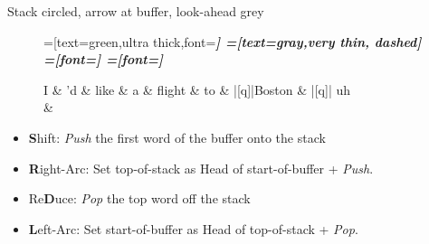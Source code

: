 \documentclass{lecture}
\begin{document}
\begin{plain}{Stack circled, arrow at buffer, look-ahead grey}
\begin{figure}
    \centering
    \begin{dependency}[theme=simple]
    =[text=green,ultra thick,font=\bfseries\itshape]
    =[text=gray,very thin, dashed]
    =[font=\bfseries\itshape]
    =[font=\itshape]
    \begin{deptext}[column sep=.075cm, row sep=.1ex]
        I \& 'd \& like \& a \& flight \& to \& |[q]|Boston \& |[q]| uh \\
         \& \\
    \end{deptext}
\end{dependency}
\end{figure}
    \begin{itemize}
        \item \textbf{S}hift: \emph{Push} the first word of the buffer onto the stack
    \item \textbf{R}ight-Arc: Set top-of-stack as Head of start-of-buffer + \emph{Push}.
    \item Re\textbf{D}uce: \emph{Pop} the top word off the stack
    \item \textbf{L}eft-Arc: Set start-of-buffer as Head of top-of-stack + \emph{Pop}.
    \end{itemize}
\end{plain}
\end{document}
